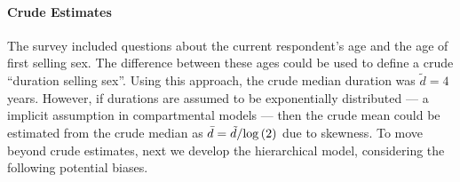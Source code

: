 \paragraph{Crude Estimates}
The survey \cite{Baral2014} included questions about
the current respondent's age and the age of first selling sex.
The difference between these ages could be used to define a crude ``duration selling sex''.
Using this approach, the crude median duration was $\tilde{d} = 4$ years.
However, if durations are assumed to be exponentially distributed
--- a implicit assumption in compartmental models \cite{Anderson1991} ---
then the crude mean could be estimated from the crude median as
$\bar{d} = \tilde{d}/\mathrm{log}\,(2)$ due to skewness.
To move beyond crude estimates, next we develop the hierarchical model,
considering the following potential biases.
